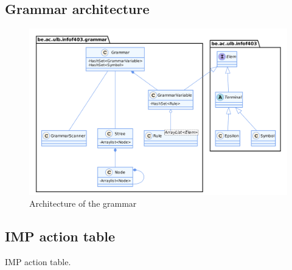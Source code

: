 \documentclass[a4paper,11pt]{article}
\begin{document}
  \subsection{Grammar architecture}
    \begin{figure}
      \centering
      \includegraphics[width=\textwidth]{./img/class_grammar.png}
      \caption{Architecture of the grammar}
      \label{fig:grammararchitecture}
    \end{figure}
    
  \subsection{IMP action table}
    \begin{table} %
      \centering
      
      \caption{IMP action table.}
      \label{impactiontable}
    \end{table}
      
\end{document}
